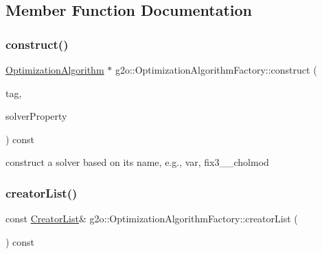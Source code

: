 \subsection{Member Function Documentation}
\mbox{\label{classg2o_1_1_optimization_algorithm_factory_a3d48f9c7c6be0428ae3d222d85f65686}} 
\subsubsection{\texorpdfstring{construct()}{construct()}}
{\footnotesize\ttfamily \mbox{\hyperlink{classg2o_1_1_optimization_algorithm}{Optimization\+Algorithm}} $\ast$ g2o\+::\+Optimization\+Algorithm\+Factory\+::construct (\begin{DoxyParamCaption}\item[{const std\+::string \&}]{tag,  }\item[{\mbox{\hyperlink{structg2o_1_1_optimization_algorithm_property}{Optimization\+Algorithm\+Property}} \&}]{solver\+Property }\end{DoxyParamCaption}) const}

construct a solver based on its name, e.\+g., var, fix3\+\_\+\_\+cholmod \mbox{\label{classg2o_1_1_optimization_algorithm_factory_ae17f0e3d3f60e5cda96651a7ded37b4c}} 
\subsubsection{\texorpdfstring{creator\+List()}{creatorList()}}
{\footnotesize\ttfamily const \mbox{\hyperlink{classg2o_1_1_optimization_algorithm_factory_a3ed210b94bf09b47e30d07da3766b4ec}{Creator\+List}}\& g2o\+::\+Optimization\+Algorithm\+Factory\+::creator\+List (\begin{DoxyParamCaption}{ }\end{DoxyParamCaption}) const\hspace{0.3cm}{\ttfamily [inline]}}



